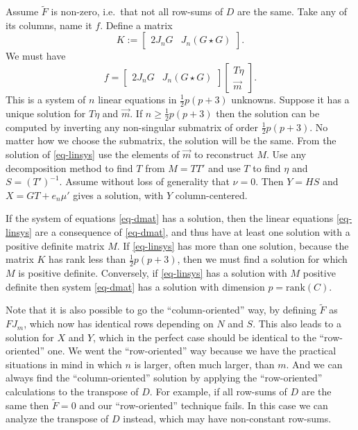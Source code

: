 \documentclass[
  12pt,
  letterpaper,
  DIV=11,
  numbers=noendperiod]{scrartcl}
\begin{document}
Assume \(\tilde F\) is non-zero, i.e.~that not all row-sums of \(D\) are
the same. Take any of its columns, name it \(f\). Define a matrix
\begin{equation}
  K := \begin{bmatrix}
         2J_nG & J_n(G \star G)
       \end{bmatrix}.\label{eq-kdef}
\end{equation} We must have \begin{equation}
f=\begin{bmatrix}2J_nG&J_n(G\star G)\end{bmatrix}\begin{bmatrix}T\eta\\\overrightarrow{m}\end{bmatrix}.\label{eq-linsys}
\end{equation} This is a system of \(n\) linear equations in
\(\frac12 p(p + 3)\) unknowns. Suppose it has a unique solution for
\(T\eta\) and \(\overrightarrow{m}\). If \(n \geq \frac12 p(p + 3)\)
then the solution can be computed by inverting any non-singular
submatrix of order \(\frac12 p(p + 3)\). No matter how we choose the
submatrix, the solution will be the same. From the solution of
\eqref{eq-linsys} use the elements of \(\overrightarrow{m}\) to
reconstruct \(M\). Use any decomposition method to find \(T\) from
\(M = TT'\) and use \(T\) to find \(\eta\) and \(S = (T')^{-1}\). Assume
without loss of generality that \(\nu = 0\). Then \(Y = HS\) and
\(X = GT + e_n\mu'\) gives a solution, with \(Y\) column-centered.

If the system of equations \eqref{eq-dmat} has a solution, then the
linear equations \eqref{eq-linsys} are a consequence of \eqref{eq-dmat},
and thus have at least one solution with a positive definite matrix
\(M\). If \eqref{eq-linsys} has more than one solution, because the
matrix \(K\) has rank less than \(\frac12p(p + 3)\), then we must find a
solution for which \(M\) is positive definite. Conversely, if
\eqref{eq-linsys} has a solution with \(M\) positive definite then
system \eqref{eq-dmat} has a solution with dimension
\(p = \text{rank}(C)\).

Note that it is also possible to go the ``column-oriented'' way, by
defining \(\tilde F\) as \(FJ_m\), which now has identical rows
depending on \(N\) and \(S\). This also leads to a solution for \(X\)
and \(Y\), which in the perfect case should be identical to the
``row-oriented'' one. We went the ``row-oriented'' way because we have
the practical situations in mind in which \(n\) is larger, often much
larger, than \(m\). And we can always find the ``column-oriented''
solution by applying the ``row-oriented'' calculations to the transpose
of \(D\). For example, if all row-sums of \(D\) are the same then
\(\tilde F = 0\) and our ``row-oriented'' technique fails. In this case
we can analyze the transpose of \(D\) instead, which may have
non-constant row-sums.
\end{document}
